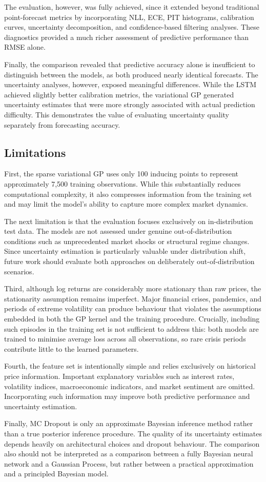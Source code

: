 The evaluation, however, was fully achieved, since it extended beyond traditional point-forecast metrics by incorporating NLL, ECE, PIT histograms, calibration curves, uncertainty decomposition, and confidence-based filtering analyses. These diagnostics provided a much richer assessment of predictive performance than RMSE alone.

Finally, the comparison revealed that predictive accuracy alone is insufficient to distinguish between the models, as both produced nearly identical forecasts. The uncertainty analyses, however, exposed meaningful differences. While the LSTM achieved slightly better calibration metrics, the variational GP generated uncertainty estimates that were more strongly associated with actual prediction difficulty. This demonstrates the value of evaluating uncertainty quality separately from forecasting accuracy.

\subsection{Limitations}

First, the sparse variational GP uses only 100 inducing points to represent approximately 7,500 training observations. While this substantially reduces computational complexity, it also compresses information from the training set and may limit the model's ability to capture more complex market dynamics.

The next limitation is that the evaluation focuses exclusively on in-distribution test data. The models are not assessed under genuine out-of-distribution conditions such as unprecedented market shocks or structural regime changes. Since uncertainty estimation is particularly valuable under distribution shift, future work should evaluate both approaches on deliberately out-of-distribution scenarios.

Third, although log returns are considerably more stationary than raw prices, the stationarity assumption remains imperfect. Major financial crises, pandemics, and periods of extreme volatility can produce behaviour that violates the assumptions embedded in both the GP kernel and the training procedure. Crucially, including such episodes in the training set is not sufficient to address this: both models are trained to minimise average loss across all observations, so rare crisis periods contribute little to the learned parameters.

Fourth, the feature set is intentionally simple and relies exclusively on historical price information. Important explanatory variables such as interest rates, volatility indices, macroeconomic indicators, and market sentiment are omitted. Incorporating such information may improve both predictive performance and uncertainty estimation.

Finally, MC Dropout is only an approximate Bayesian inference method rather than a true posterior inference procedure. The quality of its uncertainty estimates depends heavily on architectural choices and dropout behaviour. The comparison also should not be interpreted as a comparison between a fully Bayesian neural network and a Gaussian Process, but rather between a practical approximation and a principled Bayesian model.
